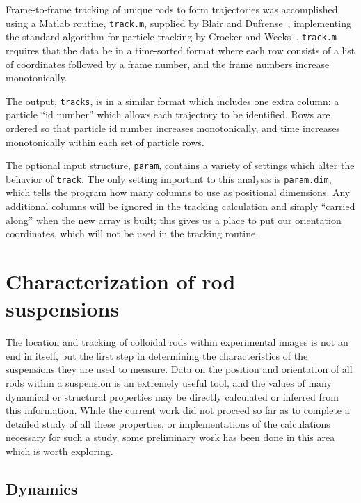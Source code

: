 Frame-to-frame tracking of unique rods to form trajectories was accomplished using a Matlab routine, \texttt{track.m}, 
supplied by Blair and Dufrense~\cite{blair-dufrense-matlab}, implementing the standard algorithm for particle tracking by
Crocker and Weeks~\cite{crocker-grier-spheres}.  \texttt{track.m} requires that the data be in a time-sorted format where each
row consists of a list of coordinates followed by a frame number, and the frame numbers increase monotonically.

The output, \texttt{tracks}, is in a similar format which includes one extra column: a particle ``id number'' which
allows each trajectory to be identified. Rows are ordered so that particle id number increases monotonically, and
time increases monotonically within each set of particle rows.

The optional input structure, \texttt{param}, contains a variety of settings which alter the behavior of 
\texttt{track}.  The only setting important to this analysis is \texttt{param.dim}, which tells the program how
many columns to use as positional dimensions. Any additional columns will be ignored in the tracking calculation and 
simply ``carried along'' when the new array is built; this gives us a place to put our orientation coordinates, which
will not be used in the tracking routine.

\section{Characterization of rod suspensions}

The location and tracking of colloidal rods within experimental images is not an end in itself, but the
first step in determining the characteristics of the suspensions they are used to measure.  Data on the 
position and orientation of all rods within a suspension is an extremely useful tool, and the values of many
dynamical or structural properties may be directly calculated or inferred from this information.
While the current work did not proceed so far as to complete a detailed study of all these properties, or 
implementations of the calculations necessary for such a study, some preliminary work has been done in this
area which is worth exploring.

\subsection{Dynamics}


